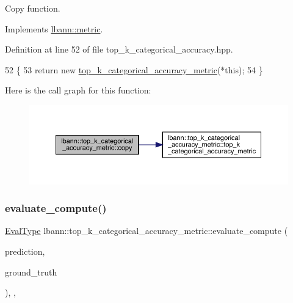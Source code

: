 Copy function. 

Implements \hyperlink{classlbann_1_1metric_a2a4498d41f77da8585552f485caab167}{lbann\+::metric}.



Definition at line 52 of file top\+\_\+k\+\_\+categorical\+\_\+accuracy.\+hpp.


\begin{DoxyCode}
52                                                            \{
53     \textcolor{keywordflow}{return} \textcolor{keyword}{new} \hyperlink{classlbann_1_1top__k__categorical__accuracy__metric_a3896f230e2972c01b746fc808c51462e}{top\_k\_categorical\_accuracy\_metric}(*\textcolor{keyword}{this});
54   \}
\end{DoxyCode}
Here is the call graph for this function\+:\nopagebreak
\begin{figure}[H]
\begin{center}
\leavevmode
\includegraphics[width=350pt]{classlbann_1_1top__k__categorical__accuracy__metric_a2d93a9bca14d52bda02a58e4c58b800e_cgraph}
\end{center}
\end{figure}
\mbox{\label{classlbann_1_1top__k__categorical__accuracy__metric_a3449bdb835e7e5bd7d17cd001fb4ae38}} 
\subsubsection{\texorpdfstring{evaluate\+\_\+compute()}{evaluate\_compute()}}
{\footnotesize\ttfamily \hyperlink{base_8hpp_a3266f5ac18504bbadea983c109566867}{Eval\+Type} lbann\+::top\+\_\+k\+\_\+categorical\+\_\+accuracy\+\_\+metric\+::evaluate\+\_\+compute (\begin{DoxyParamCaption}\item[{const \hyperlink{base_8hpp_a9a697a504ae84010e7439ffec862b470}{Abs\+Dist\+Mat} \&}]{prediction,  }\item[{const \hyperlink{base_8hpp_a9a697a504ae84010e7439ffec862b470}{Abs\+Dist\+Mat} \&}]{ground\+\_\+truth }\end{DoxyParamCaption})\hspace{0.3cm}{\ttfamily [override]}, {\ttfamily [protected]}, {\ttfamily [virtual]}}

